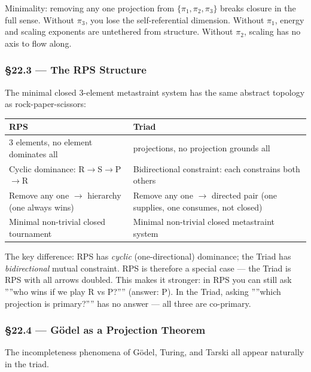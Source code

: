 \documentclass[12pt,a4paper]{article}
\newcommand{\pilcrow}{\S}
\begin{document}
Minimality: removing any one projection from $\{\pi_1, \pi_2, \pi_3\}$ breaks closure in the full sense. Without $\pi_3$, you lose the self-referential dimension. Without $\pi_1$, energy and scaling exponents are untethered from structure. Without $\pi_2$, scaling has no axis to flow along.

\subsubsection{\pilcrow{}22.3 --- The RPS Structure}

The minimal closed 3-element metastraint system has the same abstract topology as rock-paper-scissors:

\begin{table}[htbp]
\centering
\small
{}
\begin{tabularx}{\textwidth}{>{\centering\arraybackslash}X >{\centering\arraybackslash}X}
\toprule
\rowcolor{gray!25}\textbf{RPS} & \textbf{Triad} \\
\midrule
\rowcolors{1}{white}{gray!10}
3 elements, no element dominates all & 3 projections, no projection grounds all \\
Cyclic dominance: R$\rightarrow$S$\rightarrow$P$\rightarrow$R & Bidirectional constraint: each constrains both others \\
Remove any one $\rightarrow$ hierarchy (one always wins) & Remove any one $\rightarrow$ directed pair (one supplies, one consumes, not closed) \\
Minimal non-trivial closed tournament & Minimal non-trivial closed metastraint system \\
\bottomrule
\end{tabularx}
\end{table}

The key difference: RPS has \emph{cyclic} (one-directional) dominance; the Triad has \emph{bidirectional} mutual constraint. RPS is therefore a special case --- the Triad is RPS with all arrows doubled. This makes it stronger: in RPS you can still ask ''''who wins if we play R vs P?'''' (answer: P). In the Triad, asking ''''which projection is primary?'''' has no answer --- all three are co-primary.

\subsubsection{\pilcrow{}22.4 --- Gödel as a Projection Theorem}

The incompleteness phenomena of Gödel, Turing, and Tarski all appear naturally in the triad.
\end{document}
